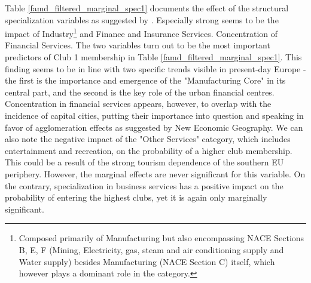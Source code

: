 \documentclass[11pt]{article}
\begin{document}
Table \ref{famd_filtered_marginal_spec1} documents the effect of the structural specialization variables as suggested by \citet{cutrini2019economic}. Especially strong seems to be the impact of Industry\footnote{Composed primarily of Manufacturing but also encompassing NACE Sections B, E, F (Mining, Electricity, gas, steam and air conditioning supply and Water supply) besides Manufacturing (NACE Section C) itself, which however plays a dominant role in the category.} and Finance and Insurance Services. Concentration of Financial Services. The two variables turn out to be the most important predictors of Club 1 membership in Table \ref{famd_filtered_marginal_spec1}. This finding seems to be in line with two specific trends visible in present-day Europe - the first is the importance and emergence of the "Manufacturing Core" in its central part, and the second is the key role of the urban financial centres. Concentration in financial services appears, however, to overlap with the incidence of capital cities, putting their importance into question and speaking in favor of agglomeration effects as suggested by New Economic Geography.
We can also note the negative impact of the "Other Services" category, which includes entertainment and recreation, on the probability of a higher club membership. This could be a result of the strong tourism dependence of the southern EU periphery. However, the marginal effects are never significant for this variable. On the contrary, specialization in business services has a positive impact on the probability of entering the highest clubs, yet it is again only marginally significant.
\end{document}

